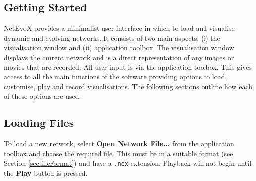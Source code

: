 \documentclass[a4paper, 11pt]{article}
\newcommand{\guitxt}[1]{{\textbf{\textsf{\small{#1}}}}}
\begin{document}
\subsection{Getting Started}
NetEvoX provides a minimalist user interface in which to load and visualise dynamic and evolving networks. It consists of two main aspects, (i) the visualisation window and (ii) application toolbox. The visualisation window displays the current network and is a direct representation of any images or movies that are recorded. All user input is via the application toolbox. This gives access to all the main functions of the software providing options to load, customise, play and record visualisations. The following sections outline how each of these options are used.

\subsection{Loading Files}
To load a new network, select \guitxt{Open Network File...} from the application toolbox and choose the required file. This must be in a suitable format (see Section \ref{sec:fileFormat}) and have a \texttt{.nex} extension. Playback will not begin until the \guitxt{Play} button is pressed.
\end{document}
